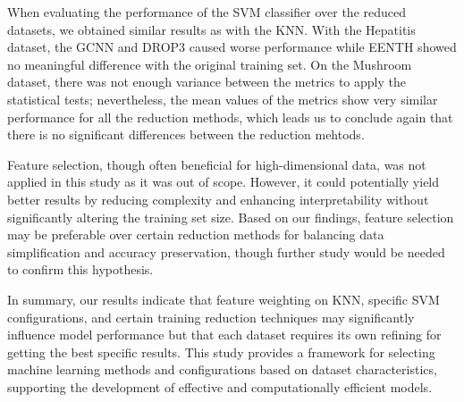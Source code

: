 When evaluating the performance of the SVM classifier over the reduced datasets, we obtained similar results as with the KNN. With the Hepatitis dataset, the GCNN and DROP3 caused worse performance while EENTH showed no meaningful difference with the original training set. On the Mushroom dataset, there was not enough variance between the metrics to apply the statistical tests; nevertheless, the mean values of the metrics show very similar performance for all the reduction methods, which leads us to conclude again that there is no significant differences between the reduction mehtods.

Feature selection, though often beneficial for high-dimensional data, was not applied in this study as it was out of scope. However, it could potentially yield better results by reducing complexity and enhancing interpretability without significantly altering the training set size. Based on our findings, feature selection may be preferable over certain reduction methods for balancing data simplification and accuracy preservation, though further study would be needed to confirm this hypothesis.

In summary, our results indicate that feature weighting on KNN, specific SVM configurations, and certain training reduction techniques may significantly influence model performance but that each dataset requires its own refining for getting the best specific results. This study provides a framework for selecting machine learning methods and configurations based on dataset characteristics, supporting the development of effective and computationally efficient models. 